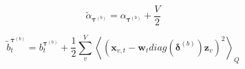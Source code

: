 \documentclass[10pt]{article}
\newcommand{\Angle}[1]{\left \langle #1 \right \rangle}
\newcommand{\Eq}[1]{\Angle{#1}_Q}
\begin{document}
    \begin{equation}
        \tilde{\alpha}_{\bm{\tau}^{(b)}} = \alpha_{\bm{\tau}^{(b)}} + \frac{V}{2}
    \end{equation}

    \begin{equation}
        \tilde{b}_t^{\bm{\tau}^{(b)}} = b_t^{\bm{\tau}^{(b)}} + \frac{1}{2}\sum_v^V\Eq{(\bm{x}_{v,t} - \bm{w}_tdiag(\bm{\delta}^{(b)})\bm{z}_v)^2}
    \end{equation}
\end{document}
